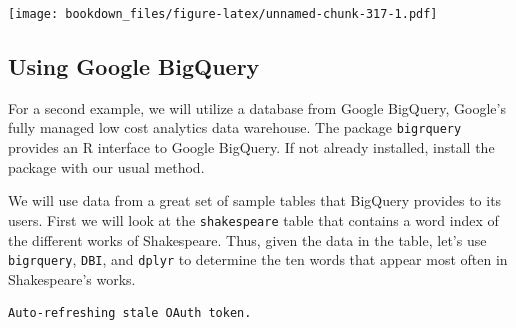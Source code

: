 \documentclass[]{krantz}
\makeatletter
\newenvironment{Shaded}{\begin{snugshade}}{\end{snugshade}}
\newcommand{\KeywordTok}[1]{\textcolor[rgb]{0.27,0.27,0.27}{\textbf{#1}}}
\newcommand{\DataTypeTok}[1]{\textcolor[rgb]{0.27,0.27,0.27}{#1}}
\newcommand{\DecValTok}[1]{\textcolor[rgb]{0.06,0.06,0.06}{#1}}
\newcommand{\StringTok}[1]{\textcolor[rgb]{0.5,0.5,0.5}{#1}}
\newcommand{\OtherTok}[1]{\textcolor[rgb]{0.37,0.37,0.37}{#1}}
\newcommand{\OperatorTok}[1]{\textcolor[rgb]{0.43,0.43,0.43}{\textbf{#1}}}
\newcommand{\NormalTok}[1]{#1}
\newenvironment{kframe}{%
\medskip{}
\setlength{\fboxsep}{.8em}
 \def\at@end@of@kframe{}%
 \ifinner\ifhmode%
  \def\at@end@of@kframe{\end{minipage}}%
  \begin{minipage}{\columnwidth}%
 \fi\fi%
 \def\FrameCommand##1{\hskip\@totalleftmargin \hskip-\fboxsep
 \colorbox{shadecolor}{##1}\hskip-\fboxsep
     \hskip-\linewidth \hskip-\@totalleftmargin \hskip\columnwidth}%
 \MakeFramed {\advance\hsize-\width
   \@totalleftmargin\z@ \linewidth\hsize
   \@setminipage}}%
 {\par\unskip\endMakeFramed%
 \at@end@of@kframe}
\renewenvironment{Shaded}{\begin{kframe}}{\end{kframe}}
\makeatother
\begin{document}
\texttt{[image: bookdown\_files/figure-latex/unnamed-chunk-317-1.pdf]}

\subsection{Using Google BigQuery}\label{using-google-bigquery}

For a second example, we will utilize a database from Google BigQuery,
Google's fully managed low cost analytics data warehouse. The package
\texttt{bigrquery} provides an R interface to Google BigQuery. If not
already installed, install the package with our usual method.

We will use data from a great set of sample tables that BigQuery
provides to its users. First we will look at the \texttt{shakespeare}
table that contains a word index of the different works of Shakespeare.
Thus, given the data in the table, let's use \texttt{bigrquery},
\texttt{DBI}, and \texttt{dplyr} to determine the ten words that appear
most often in Shakespeare's works.

\begin{Shaded}
\end{Shaded}

\begin{verbatim}
Auto-refreshing stale OAuth token.
\end{verbatim}

\begin{Shaded}
\end{Shaded}
\end{document}
